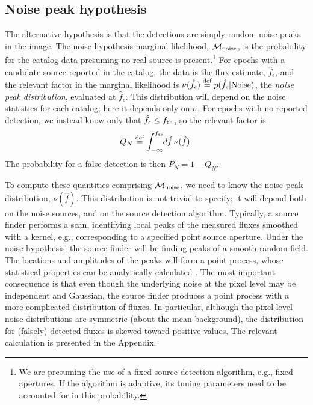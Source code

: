 \documentclass[twocolumn]{emulateapj}
\newcommand*{\defeq}{\stackrel{\text{def}}{=}}
\newcommand{\eind}{\epsilon}  %
\newcommand{\mlike}{\mathcal{M}}  %
\newcommand{\flux}{f}
\newcommand{\fest}{\hat{\flux}}  %
\newcommand{\fth}{\flux_{\rm th}}
\newcommand{\npd}{\nu}  %
\begin{document}
\subsection{Noise peak hypothesis}\label{sec:peaks}
\noindent
%
The alternative hypothesis is that the detections are simply random noise peaks in the image.
The noise hypothesis marginal likelihood, $\mlike_{\rm noise}$, is the probability for the catalog data presuming no real source is present.\footnote{We are presuming the use of a fixed source detection algorithm, e.g., fixed apertures. 
If the algorithm is adaptive, its tuning parameters need to be accounted for in this probability.}
For epochs with a candidate source reported in the catalog, the data is the flux estimate, $\fest_\eind$, and the relevant factor in the marginal likelihood is $\npd(\fest_\eind) \defeq p(\fest_\eind|\rm{Noise})$, the \emph{noise peak distribution}, evaluated at $\fest_\eind$.
This distribution will depend on the noise statistics for each catalog; here it depends only on $\sigma$.
For epochs with no reported detection, we instead know only that $\fest_\eind \le \fth$, so the relevant factor is
\begin{equation} \label{eq:Q-noise}
Q_N \defeq \int_{-\infty}^{\fth}\!\!d\fest\,\npd(\fest).
\end{equation}
The probability for a false detection is then $P_N = 1 - Q_N$.

To compute these quantities comprising $\mlike_{\rm noise}$, we need to know the noise peak distribution, $\npd(\fest)$.
This distribution is not trivial to specify; it will depend both on the noise sources, and on the source detection algorithm.
%
Typically, a source finder performs a scan, identifying local peaks of the measured fluxes smoothed with a kernel, e.g., corresponding to a specified point source aperture.
Under the noise hypothesis, the source finder will be finding peaks of a smooth random field.
The locations and amplitudes of the peaks will form a point process, whose statistical properties can be analytically calculated \citep{adler,bbks,bond,kaiser}.
%
The most important consequence is that even though the underlying noise at the pixel level may be independent and Gaussian, the source finder produces a point process with a more complicated distribution of fluxes.
In particular, although the pixel-level noise distributions are symmetric (about the mean background), the distribution for (falsely) detected fluxes is skewed toward positive values.
%
The relevant calculation is presented in the Appendix.
\end{document}
